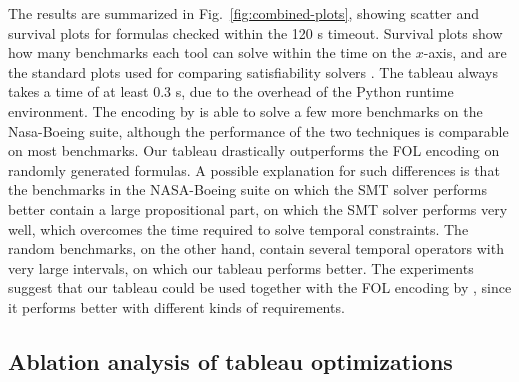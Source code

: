 \documentclass[acmsmall,screen]{acmart}
\begin{document}
The results are summarized in Fig.~\ref{fig:combined-plots}, showing scatter and survival plots for formulas checked within the 120 s timeout.
Survival plots show how many benchmarks each tool can solve within the time on the $x$-axis,
and are the standard plots used for comparing satisfiability solvers \cite{BrainDG17}.
The tableau always takes a time of at least 0.3 s, due to the overhead of the Python runtime environment.
The encoding by \citet{LiVR22} is able to solve a few more benchmarks on the Nasa-Boeing suite, although the performance of the two techniques is comparable on most benchmarks.
Our tableau drastically outperforms the FOL encoding on randomly generated formulas.
A possible explanation for such differences is that the benchmarks in the NASA-Boeing suite on which the SMT solver performs better contain a large propositional part, on which the SMT solver performs very well, which overcomes the time required to solve temporal constraints.
The random benchmarks, on the other hand, contain several temporal operators with very large intervals, on which our tableau performs better.
The experiments suggest that our tableau could be used together with the FOL encoding by \citet{LiVR22}, since it performs better with different kinds of requirements.

\subsection{Ablation analysis of tableau optimizations}
\label{sec:ablation}
\end{document}
